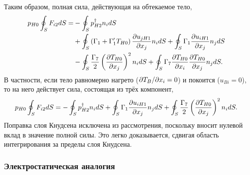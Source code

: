 Таким образом, полная сила, действующая на обтекаемое тело,
\begin{align}\label{eq:kgf:force_general}
    p_{H0} \oint_S F_{i2} \dd{S} =
        &- \oint_S p_{H2}^\dag n_i \dd{S} \notag\\
        &+ \oint_S \left( \Gamma_1 + \Gamma_1'T_{H0} \right) \pder[u_{jH1}]{x_j} n_i \dd{S}
        +  \oint_S \Gamma_1 \pder[u_{iH1}]{x_j} n_j \dd{S} \notag\\
        &- \oint_S \frac{\Gamma_7}2\left(\pder[T_{H0}]{x_j}\right)^2 n_i \dd{S}
        +  \oint_S \Gamma_7\pder[T_{H0}]{x_i}\pder[T_{H0}]{x_j} n_j \dd{S}.
\end{align}
В частности, если тело равномерно нагрето (\(\Pder[T_B]{x_i}=0\)) и покоится (\(u_{Bi}=0\)),
то на него действует сила, состоящая из трёх компонент,
\begin{equation}\label{eq:kgf:force}
    p_{H0} \oint_S F_{i2} \dd{S} =
        - \oint_S p_{H2}^\dag n_i \dd{S} \\
        + \oint_S \Gamma_1\pder[u_{iH1}]{x_j} n_j \dd{S}
        + \oint_S \frac{\Gamma_7}2\left(\pder[T_{H0}]{x_j}\right)^2 n_i \dd{S}.
\end{equation}
Поправка слоя Кнудсена исключена из рассмотрения, поскольку вносит нулевой вклад в значение полной силы.
Это легко доказывается, сдвигая область интегрирования за пределы слоя Кнудсена.

\subsubsection{Электростатическая аналогия}

